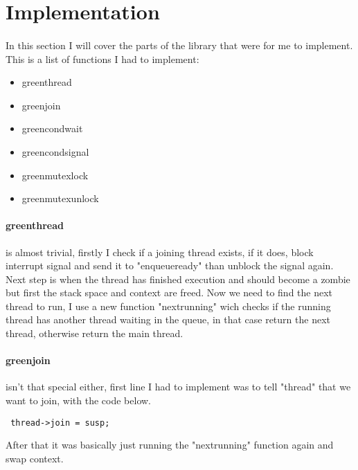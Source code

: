 \documentclass[11pt]{article}
\begin{document}
\section{Implementation}

\paragraph{}
In this section I will cover the parts of the library that were for me to implement. \\ 
This is a list of functions I had to implement:

\begin{itemize}
    \setlength\itemsep{0.1em}
    \item green\textunderscore thread
    \item green\textunderscore join
    \item green\textunderscore cond\textunderscore wait
    \item green\textunderscore cond\textunderscore signal
    \item green\textunderscore mutex\textunderscore lock
    \item green\textunderscore mutex\textunderscore unlock
\end{itemize}

\paragraph{green\textunderscore thread}
is almost trivial, firstly I check if a joining thread exists, if it does, block interrupt signal and send it to "enqueue\textunderscore ready"
than unblock the signal again. Next step is when the thread has finished execution and should become a zombie but first the stack space and context
are freed. Now we need to find the next thread to run, I use a new function "next\textunderscore running" wich checks if the running
thread has another thread waiting in the queue, in that case return the next thread, otherwise return the main thread.

\paragraph{green\textunderscore join}
isn't that special either, first line I had to implement was to tell "thread" that we want to join, with the code below. 
\begin{verbatim} thread->join = susp; \end{verbatim}
After that it was basically just running the "next\textunderscore running" function again and swap context.
\end{document}

